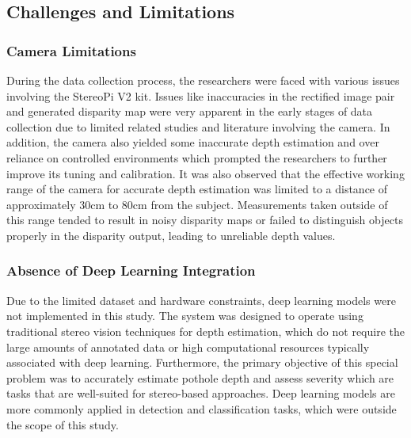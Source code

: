 \subsection{Challenges and Limitations}

\subsubsection{Camera Limitations}
During the data collection process, the researchers were faced with various issues involving the StereoPi V2 kit. Issues like inaccuracies in the rectified image pair and generated disparity map were very apparent in the early stages of data collection due to limited related studies and literature involving the camera. In addition, the camera also yielded some inaccurate depth estimation and over reliance on controlled environments which prompted the researchers to further improve its tuning and calibration. It was also observed that the effective working range of the camera for accurate depth estimation was limited to a distance of approximately 30cm to 80cm from the subject. Measurements taken outside of this range tended to result in noisy disparity maps or failed to distinguish objects properly in the disparity output, leading to unreliable depth values.

\subsubsection{Absence of Deep Learning Integration}

Due to the limited dataset and hardware constraints, deep learning models were not implemented in this study. The system was designed to operate using traditional stereo vision techniques for depth estimation, which do not require the large amounts of annotated data or high computational resources typically associated with deep learning. Furthermore, the primary objective of this special problem was to accurately estimate pothole depth and assess severity which are tasks that are well-suited for stereo-based approaches. Deep learning models are more commonly applied in detection and classification tasks, which were outside the scope of this study.



